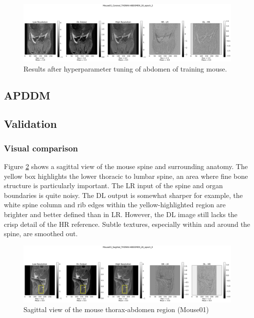 \documentclass[twocolumn]{article}
\begin{document}
\begin{figure}
    \centering
    \includegraphics[width=1\linewidth]{Mouse01_Coronal_THORAX-ABDOMEN_20_epoch_2.png}
    \caption{Results after hyperparameter tuning of abdomen of training mouse.}
    \label{fig:second_coronal}
\end{figure}
   

\subsection{APDDM}

\subsection{Validation}


\subsubsection{Visual comparison}
Figure \ref{fig:val_1} shows a sagittal view of the mouse spine and surrounding anatomy. 
The yellow box highlights the lower thoracic to lumbar spine, an area where fine bone structure is particularly important. 
The LR input of the spine and organ boundaries is quite noisy. 
The DL output is somewhat sharper for example, the white spine column and rib edges within the yellow-highlighted region are brighter and better defined than in LR. 
However, the DL image still lacks the crisp detail of the HR reference. 
Subtle textures, especially within and around the spine, are smoothed out.

\begin{figure}
    \centering
    \includegraphics[width=1\linewidth]{Mouse01_Sagittal_val.png}
    \caption{Sagittal view of the mouse thorax-abdomen region (Mouse01)}
    \label{fig:val_1}
\end{figure}
\end{document}
